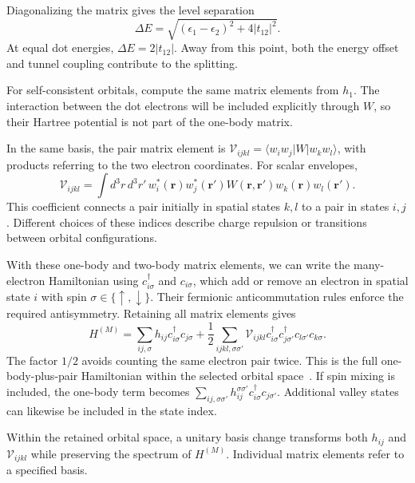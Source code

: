 Diagonalizing the matrix gives the level separation
\begin{equation}
 \Delta E=\sqrt{(\epsilon_1-\epsilon_2)^2+4|t_{12}|^2}.
 \label{eq:device-two-level-splitting}
\end{equation}
At equal dot energies, $\Delta E=2|t_{12}|$.
Away from this point, both the energy offset and tunnel coupling
contribute to the splitting.

For self-consistent orbitals, compute the same matrix elements
from $h_1$. The interaction between the dot electrons will be
included explicitly through $W$, so their Hartree potential is
not part of the one-body matrix.

In the same basis, the pair matrix element is
$\mathcal V_{ijkl}=\langle w_iw_j|W|w_kw_l\rangle$, with products
referring to the two electron coordinates. For scalar envelopes,
\begin{equation}
 \mathcal V_{ijkl}
   =\int d^3r\,d^3r'\,
      w_i^*(\mathbf r)w_j^*(\mathbf r')W(\mathbf r,\mathbf r')
      w_k(\mathbf r)w_l(\mathbf r').
 \label{eq:device-coulomb-matrix}
\end{equation}
This coefficient connects a pair initially in spatial states
$k,l$ to a pair in states $i,j$. Different choices of these indices
describe charge repulsion or transitions between orbital configurations.

With these one-body and two-body matrix elements, we can write
the many-electron Hamiltonian using
$c_{i\sigma}^\dagger$ and $c_{i\sigma}$, which add or remove an
electron in spatial state $i$ with spin
$\sigma\in\{\uparrow,\downarrow\}$. Their fermionic
anticommutation rules enforce the required antisymmetry.
Retaining all matrix elements gives
\begin{equation}
 H^{(M)}
 =\sum_{ij,\sigma}h_{ij}c_{i\sigma}^\dagger c_{j\sigma}
  +\frac12\sum_{ijkl,\sigma\sigma'}
      \mathcal V_{ijkl}
      c_{i\sigma}^\dagger c_{j\sigma'}^\dagger
      c_{l\sigma'}c_{k\sigma}.
 \label{eq:device-projected-hamiltonian}
\end{equation}
The factor $1/2$ avoids counting the same electron pair twice.
This is the full one-body-plus-pair Hamiltonian within the selected
orbital space~\cite{QTCADManyBody}. If spin mixing is included,
the one-body term becomes
$\sum_{ij,\sigma\sigma'}h_{ij}^{\sigma\sigma'}
c_{i\sigma}^\dagger c_{j\sigma'}$. Additional valley states can
likewise be included in the state index.

Within the retained orbital space, a unitary basis change
transforms both $h_{ij}$ and $\mathcal V_{ijkl}$ while preserving
the spectrum of $H^{(M)}$. Individual matrix elements refer to a
specified basis.

